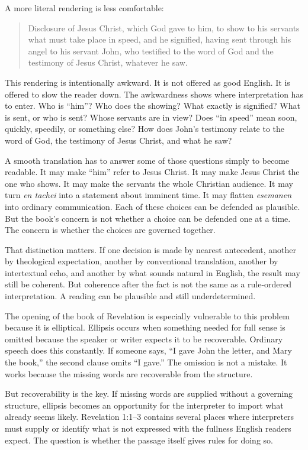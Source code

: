 A more literal rendering is less comfortable:

\begin{quote}
Disclosure of Jesus Christ, which God gave to him, to show to his servants what must take place in speed, and he signified, having sent through his angel to his servant John, who testified to the word of God and the testimony of Jesus Christ, whatever he saw.
\end{quote}

This rendering is intentionally awkward. It is not offered as good English. It is offered to slow the reader down. The awkwardness shows where interpretation has to enter. Who is ``him''? Who does the showing? What exactly is signified? What is sent, or who is sent? Whose servants are in view? Does ``in speed'' mean soon, quickly, speedily, or something else? How does John's testimony relate to the word of God, the testimony of Jesus Christ, and what he saw?

A smooth translation has to answer some of those questions simply to become readable. It may make ``him'' refer to Jesus Christ. It may make Jesus Christ the one who shows. It may make the servants the whole Christian audience. It may turn \textit{en tachei} into a statement about imminent time. It may flatten \textit{esemanen} into ordinary communication. Each of these choices can be defended as plausible. But the book's concern is not whether a choice can be defended one at a time. The concern is whether the choices are governed together.

That distinction matters. If one decision is made by nearest antecedent, another by theological expectation, another by conventional translation, another by intertextual echo, and another by what sounds natural in English, the result may still be coherent. But coherence after the fact is not the same as a rule-ordered interpretation. A reading can be plausible and still underdetermined.

The opening of the book of Revelation is especially vulnerable to this problem because it is elliptical. Ellipsis occurs when something needed for full sense is omitted because the speaker or writer expects it to be recoverable. Ordinary speech does this constantly. If someone says, ``I gave John the letter, and Mary the book,'' the second clause omits ``I gave.'' The omission is not a mistake. It works because the missing words are recoverable from the structure.

But recoverability is the key. If missing words are supplied without a governing structure, ellipsis becomes an opportunity for the interpreter to import what already seems likely. Revelation 1:1--3 contains several places where interpreters must supply or identify what is not expressed with the fullness English readers expect. The question is whether the passage itself gives rules for doing so.

